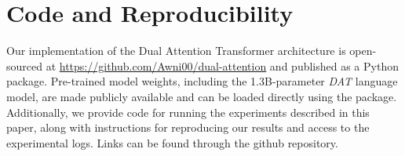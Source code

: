 \section*{Code and Reproducibility}

Our implementation of the Dual Attention Transformer architecture is open-sourced at \url{https://github.com/Awni00/dual-attention} and published as a Python package. Pre-trained model weights, including the 1.3B-parameter \textit{DAT} language model, are made publicly available and can be loaded directly using the package. Additionally, we provide code for running the experiments described in this paper, along with instructions for reproducing our results and access to the experimental logs. Links can be found through the github repository.

